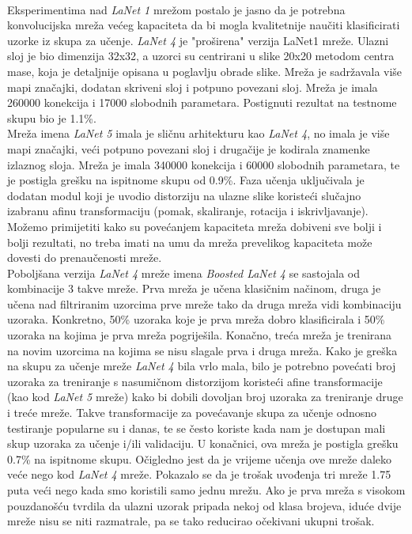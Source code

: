 \documentclass[times, utf8, diplomski]{fer}
\theoremstyle{definition}
\begin{document}
\\
Eksperimentima nad \textit{LaNet 1} mrežom postalo je jasno da je potrebna konvolucijska mreža većeg kapaciteta da bi mogla kvalitetnije naučiti klasificirati uzorke iz skupa za učenje. \textit{LaNet 4} je "proširena" verzija LaNet1 mreže. Ulazni sloj je bio dimenzija 32x32,  a uzorci su centrirani u slike 20x20 metodom centra mase, koja je detaljnije opisana u poglavlju obrade slike. Mreža je sadržavala više mapi značajki, dodatan skriveni sloj i potpuno povezani sloj. Mreža je imala 260000 konekcija i 17000 slobodnih parametara. Postignuti rezultat na testnome skupu bio je 1.1\%.
\\
Mreža imena \textit{LaNet 5} imala je sličnu arhitekturu kao \textit{LaNet 4}, no imala je više mapi značajki, veći potpuno povezani sloj i drugačije je kodirala znamenke izlaznog sloja. Mreža je imala 340000 konekcija i 60000 slobodnih parametara, te je postigla grešku na ispitnome skupu od 0.9\%. Faza učenja uključivala je dodatan modul koji je uvodio distorziju na ulazne slike koristeći slučajno izabranu afinu transformaciju (pomak, skaliranje, rotacija i iskrivljavanje). Možemo primijetiti kako su povećanjem kapaciteta mreža dobiveni sve bolji i bolji rezultati, no treba imati na umu da mreža prevelikog kapaciteta može dovesti do prenaučenosti mreže.
\\
Poboljšana verzija \textit{LaNet 4} mreže imena \textit{Boosted LaNet 4} se sastojala od kombinacije 3 takve mreže. Prva mreža je učena klasičnim načinom, druga je učena nad  filtriranim uzorcima prve mreže tako da druga mreža vidi kombinaciju uzoraka. Konkretno, 50\% uzoraka koje je prva mreža dobro klasificirala i 50\% uzoraka na kojima je prva mreža pogriješila. Konačno, treća mreža je trenirana na novim uzorcima na kojima se nisu slagale prva i druga mreža. Kako je greška na skupu za učenje mreže \textit{LaNet 4} bila vrlo mala, bilo je potrebno povećati broj uzoraka za treniranje s nasumičnom distorzijom koristeći afine transformacije (kao kod \textit{LaNet 5} mreže) kako bi dobili dovoljan broj uzoraka za treniranje druge i treće mreže. Takve transformacije za povećavanje skupa za učenje odnosno testiranje popularne su i danas, te se često koriste kada nam je dostupan mali skup uzoraka za učenje i/ili validaciju. U konačnici, ova mreža je postigla grešku 0.7\% na ispitnome skupu. Očigledno jest da je vrijeme učenja ove mreže daleko veće nego kod \textit{LaNet 4} mreže. Pokazalo se da je trošak uvođenja tri mreže 1.75 puta veći nego kada smo koristili samo jednu mrežu. Ako je prva mreža s visokom pouzdanošću tvrdila da ulazni uzorak pripada nekoj od klasa brojeva, iduće dvije mreže nisu se niti razmatrale, pa se tako reducirao očekivani ukupni trošak.
\end{document}
